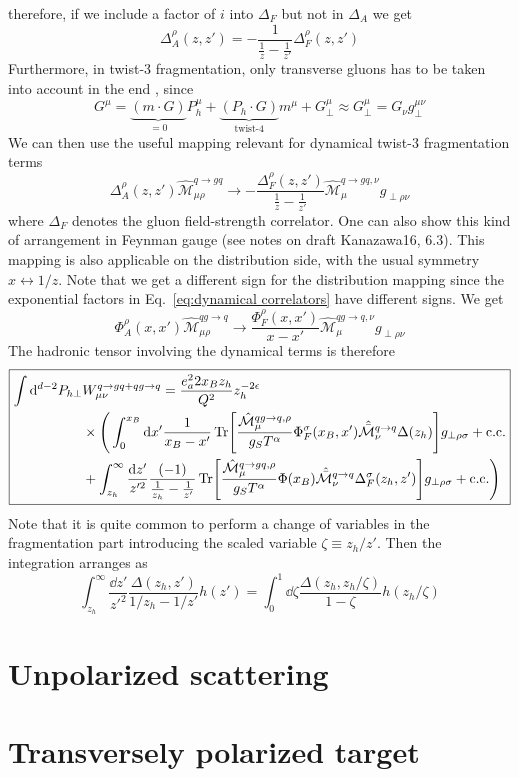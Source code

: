 therefore, if we include a factor of $i$ into $\Delta_F$ but not in $\Delta_A$ we get
\begin{equation}
     \Delta_A^\rho(z,z')=-\frac{1}{\frac{1}{z}-\frac{1}{z'}}\Delta^\rho_F(z,z')
\end{equation}
Furthermore, in twist-3 fragmentation, only transverse gluons has to be taken into account in the end \cite{boer_universality_2003}, since 
\begin{equation}
    G^\mu=\underbrace{(m\cdot G)}_{=0}P_h^\mu+\underbrace{(P_h \cdot G)}_{\text{twist-4}}m^\mu+G_\perp^\mu\approx G_\perp^\mu=G_\nu g_\perp^{\mu\nu}
\end{equation}
We can then use the useful mapping relevant for dynamical twist-3 fragmentation terms
\begin{equation}
    \Delta_A^\rho(z,z')\hat{ \mathcal{M}}^{q \to gq}_{\mu\rho}\to-\frac{\Delta_F^\rho(z,z')}{\frac{1}{z}-\frac{1}{z'}}\hat{ \mathcal{M}}_\mu^{q\to gq,\nu}g_{\perp\rho\nu}
\end{equation}
where $\Delta_F$ denotes the gluon field-strength correlator. One can also show this kind of arrangement in Feynman gauge (see notes on draft Kanazawa16, 6.3). This mapping is also applicable on the distribution side, with the usual symmetry $x \leftrightarrow1/z$. Note that we get a different sign for the distribution mapping since the exponential factors in Eq.~\ref{eq:dynamical correlators} have different signs. We get
\begin{equation}
    \Phi_A^\rho(x,x')\hat{ \mathcal{M}}^{q g\to q}_{\mu\rho}\to\frac{\Phi_F^\rho(x,x')}{x-x'}\hat{ \mathcal{M}}_\mu^{qg\to q,\nu}g_{\perp\rho\nu}
\end{equation}
The hadronic tensor involving the dynamical terms is therefore
\begin{equation}    \label{eq:hadronic tensor LO dynamical}\boxed{
    \begin{aligned}
            \int\dd^{d-2}P_{h\perp}& W_{\mu\nu}^{q \to gq+qg\to q} = \frac{e_a^22x_B z_h}{Q^2} z_h^{-2\epsilon}\\&\times\Bigg(\int _0^{x_B}\dd x'\frac{1}{x_B-x'}\Tr[\frac{\hat{\mathcal{M}}_\mu^{q g \to q,\rho}}{g_S T^\alpha} \Phi_F^\sigma(x_B,x')\hat{\bar{\mathcal{M}}}_\nu^{q\to q}\Delta(z_h)]g_{\perp\rho\sigma} + \text{c.c.}\\
        &+\int _{z_h}^\infty\frac{\dd z'}{z'^2}\frac{(-1)}{\frac{1}{z_h}-\frac{1}{z'}}\Tr[\frac{\hat{\mathcal{M}}_\mu^{q  \to g q,\rho}}{g_S T^\alpha}\Phi(x_B)\hat{\bar{\mathcal{M}}}_\nu^{q\to q}\Delta_F^\sigma(z_h,z')]g_{\perp\rho\sigma}  + \text{c.c.}\Bigg)
    \end{aligned} }
\end{equation}
Note that it is quite common to perform a change of variables in the fragmentation part introducing the scaled variable $\zeta \equiv z_h/z'$. Then the integration arranges as
\begin{equation}
    \int_{z_h}^\infty\frac{\dd z'}{z'^2}\frac{\Delta(z_h,z')}{1/z_h-1/z'} h(z')= \int_{0}^1 \dd \zeta\frac{\Delta\left(z_h,z_h/\zeta\right)}{1-\zeta}h(z_h/\zeta)
\end{equation}


\section{Unpolarized scattering}
\section{Transversely polarized target}

